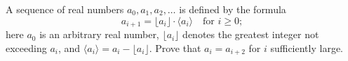 A sequence of real numbers $a_0, a_1, a_2, \ldots$ is defined by the formula
\[
a_{i+1} = \lfloor a_i \rfloor \cdot \langle a_i \rangle \quad \text{for } i \geq 0;
\]
here $a_0$ is an arbitrary real number, $\lfloor a_i \rfloor$ denotes the greatest integer not exceeding $a_i$, and $\langle a_i \rangle = a_i - \lfloor a_i \rfloor$. Prove that $a_i = a_{i+2}$ for $i$ sufficiently large.
